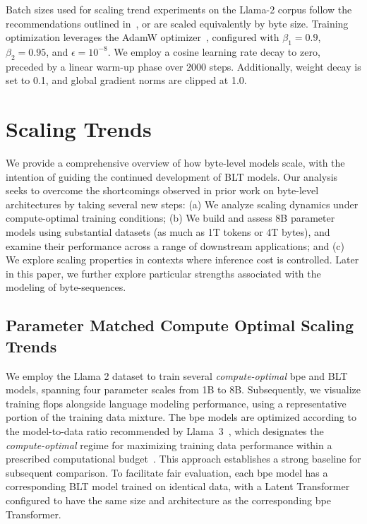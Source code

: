 Batch sizes used for scaling trend experiments on the Llama-2 corpus follow the recommendations outlined in~\cite{dubey2024llama}, or are scaled equivalently by byte size. Training optimization leverages the AdamW optimizer~\citep{adamw}, configured with $\beta_1=0.9$, $\beta_2=0.95$, and $\epsilon=10^{-8}$. We employ a cosine learning rate decay to zero, preceded by a linear warm-up phase over 2000 steps. Additionally, weight decay is set to 0.1, and global gradient norms are clipped at 1.0.

\section{Scaling Trends}
\label{section:scaling}

We provide a comprehensive overview of how byte-level models scale, with the intention of guiding the continued development of {\textsc BLT} models. Our analysis seeks to overcome the shortcomings observed in prior work on byte-level architectures by taking several new steps: (a) We analyze scaling dynamics under compute-optimal training conditions; (b) We build and assess 8B parameter models using substantial datasets (as much as 1T tokens or 4T bytes), and examine their performance across a range of downstream applications; and (c) We explore scaling properties in contexts where inference cost is controlled. Later in this paper, we further explore particular strengths associated with the modeling of byte-sequences.

\subsection{Parameter Matched Compute Optimal Scaling Trends}
\label{section:parameter-matched-scaling}
We employ the Llama 2 dataset to train several \textit{compute-optimal} bpe and {\textsc BLT} models, spanning four parameter scales from 1B to 8B. Subsequently, we visualize training flops alongside language modeling performance, using a representative portion of the training data mixture. The bpe models are optimized according to the model-to-data ratio recommended by Llama~3~\citep{dubey2024llama}, which designates the \textit{compute-optimal} regime for maximizing training data performance within a prescribed computational budget~\citep{hoffmann2022training}. This approach establishes a strong baseline for subsequent comparison. To facilitate fair evaluation, each bpe model has a corresponding {\textsc BLT} model trained on identical data, with a Latent Transformer configured to have the same size and architecture as the corresponding bpe Transformer.


